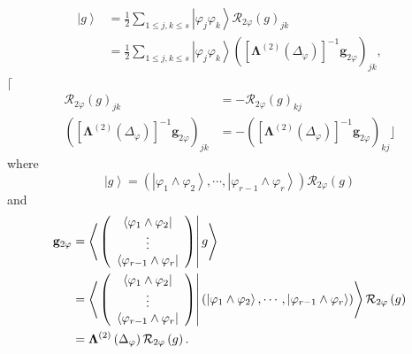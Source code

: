 \documentclass[aps,preprint]{revtex4}%
\begin{document}
\begin{align}
\left\vert g\right\rangle  &  =\frac{1}{2}\sum_{1\leq j,k\leq s}\left\vert
\varphi_{j}\varphi_{k}\right\rangle \mathcal{R}_{2\varphi}\left(  g\right)
_{jk}\nonumber\\
&  =\frac{1}{2}\sum_{1\leq j,k\leq s}\left\vert \varphi_{j}\varphi
_{k}\right\rangle \left(  \left[  \mathbf{\Lambda}^{\left(  2\right)  }\left(
\Delta_{\varphi}\right)  \right]  ^{-1}\mathbf{g}_{2\varphi}\right)  _{jk},
\end{align}
$\lceil$%
\begin{align}
\mathcal{R}_{2\varphi}\left(  g\right)  _{jk}  &  =-\mathcal{R}_{2\varphi
}\left(  g\right)  _{kj}\nonumber\\
\left(  \left[  \mathbf{\Lambda}^{\left(  2\right)  }\left(  \Delta_{\varphi
}\right)  \right]  ^{-1}\mathbf{g}_{2\varphi}\right)  _{jk}  &  =-\left(
\left[  \mathbf{\Lambda}^{\left(  2\right)  }\left(  \Delta_{\varphi}\right)
\right]  ^{-1}\mathbf{g}_{2\varphi}\right)  _{kj}\rfloor
\end{align}
where
\begin{equation}
\left\vert g\right\rangle =\left(  \left\vert \varphi_{1}\wedge\varphi
_{2}\right\rangle ,\cdots,\left\vert \varphi_{r-1}\wedge\varphi_{r}%
\right\rangle \right)  \mathcal{R}_{2\varphi}\left(  g\right)
\end{equation}
and
\begin{align}
\mathbf{g}_{2\varphi}  &  =\left\langle \left.  \left(
\begin{array}
[c]{c}%
\left\langle \varphi_{1}\wedge\varphi_{2}\right\vert \\
\vdots\\
\left\langle \varphi_{r-1}\wedge\varphi_{r}\right\vert
\end{array}
\right)  \right\vert g\right\rangle \\
&  =\left\langle \left.  \left(
\begin{array}
[c]{c}%
\left\langle \varphi_{1}\wedge\varphi_{2}\right\vert \\
\vdots\\
\left\langle \varphi_{r-1}\wedge\varphi_{r}\right\vert
\end{array}
\right)  \right\vert \left(  \left\vert \varphi_{1}\wedge\varphi
_{2}\right\rangle ,\cdots,\left\vert \varphi_{r-1}\wedge\varphi_{r}%
\right\rangle \right)  \right\rangle \mathcal{R}_{2\varphi}\left(  g\right) \\
&  =\mathbf{\Lambda}^{\left(  2\right)  }\left(  \Delta_{\varphi}\right)
\mathcal{R}_{2\varphi}\left(  g\right)  .
\end{align}
\end{document}
